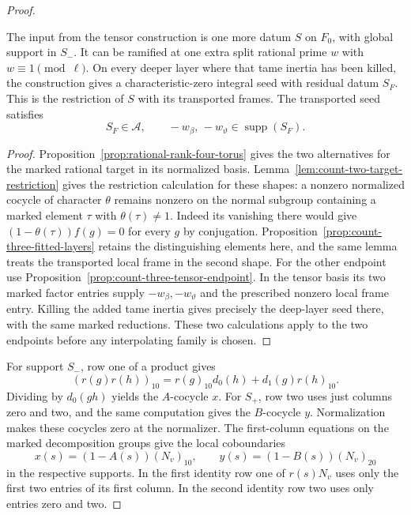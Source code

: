 \begin{proof}
\begin{established}
The input from the tensor construction is one more
datum \(S\) on \(F_0\), with global support in \(S_-\).
It can be ramified at one extra split rational prime
\(w\) with \(w\equiv1\pmod\ell\). On every deeper
layer where that tame inertia has been killed, the
construction gives a characteristic-zero integral
seed with residual datum \(S_F\). This is the
restriction of \(S\) with its transported frames.
The transported seed satisfies
\[
      S_F\in\mathcal A,\qquad
        -w_\beta,\,-w_\vartheta\in\operatorname{supp}(S_F).
\]
\end{established}
\begin{proof}
Proposition~\ref{prop:rational-rank-four-torus} gives the two
alternatives for the marked rational target in its normalized
basis. Lemma~\ref{lem:count-two-target-restriction} gives the restriction
calculation for these shapes: a nonzero normalized cocycle of
character \(\theta\) remains nonzero on the normal subgroup
containing a marked element \(\tau\) with \(\theta(\tau)\ne1\).
Indeed its vanishing there would give
\((1-\theta(\tau))f(g)=0\) for every \(g\) by conjugation.
Proposition~\ref{prop:count-three-fitted-layers} retains the
distinguishing elements here, and the same lemma treats the
transported local frame in the second shape.
For the other endpoint use Proposition~\ref{prop:count-three-tensor-endpoint}.
In the tensor basis its two marked factor entries supply
\(-w_\beta,-w_\vartheta\) and the prescribed nonzero local frame
entry. Killing the added tame inertia gives precisely the deep-layer
seed there, with the same marked reductions. These two calculations
apply to the two endpoints before any interpolating family is chosen.
\end{proof}

For support \(S_-\), row one of a product gives
\[
 (r(g)r(h))_{10}=r(g)_{10}d_0(h)+d_1(g)r(h)_{10}.
\]
Dividing by \(d_0(gh)\) yields the \(A\)-cocycle \(x\).
For \(S_+\), row two uses just columns zero and two,
and the same computation gives the \(B\)-cocycle \(y\). Normalization makes
these cocycles zero at the normalizer.
The first-column equations on the marked
decomposition groups give the local coboundaries
\[
 x(s)=(1-A(s))(N_v)_{10},\qquad
 y(s)=(1-B(s))(N_v)_{20}
\]
in the respective supports. In the first identity
row one of \(r(s)N_v\) uses only the first two
entries of its first column. In the second identity
row two uses only entries zero and two.


\end{proof}
